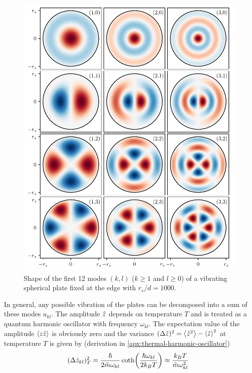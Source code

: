 \begin{figure}[!htbp]
  \centering
  \includegraphics[width=\textwidth]{./../figures/vibrations/vibrational-modes-rd_bu.pdf}
  \caption{Shape of the first 12 modes $(k,l)$ ($k \geq 1$ and $l \geq 0$) of a vibrating spherical plate fixed at the edge with $r_s/d = 1000$.}
  \label{fig:5:vibrational-modes}
\end{figure}
In general, any possible vibration of the plates can be decomposed into a sum of these modes $u_{kl}$.
The amplitude $\hat{z}$ depends on temperature $T$ and is treated as a quantum harmonic oscillator with frequency $\omega_{kl}$.
The expectation value of the amplitude $\left\langle z\hat{z}\right\rangle$ is obviously zero and the variance $(\Delta \hat{z})^2 = \left\langle\hat{z}^2\right\rangle - \left\langle\hat{z}\right\rangle^2$ at temperature $T$ is given by (derivation in \cref{apx:thermal-harmonic-oscillator})
\begin{equation}\label{eq:5:amplitude-variance}
  (\Delta \hat{z}_{kl})^2_T = \frac{\hbar}{2\tilde{m}\omega_{kl}}\coth(\frac{\hbar \omega_{kl}}{2k_BT}) \approx \frac{k_B T}{\tilde{m}\omega_{kl}^2}
\end{equation}
